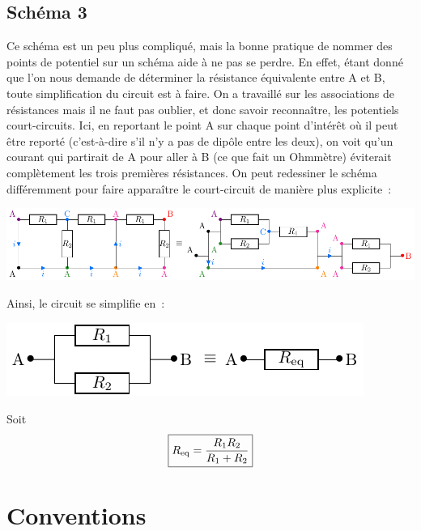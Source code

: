 \documentclass[../../main/main.tex]{subfiles}
\begin{document}
{\subsection{Schéma 3}
Ce schéma est un peu plus compliqué, mais la bonne pratique de nommer des points
de potentiel sur un schéma aide à ne pas se perdre. En effet, étant donné que
l'on nous demande de déterminer la résistance équivalente entre A et B, toute
simplification du circuit est à faire. On a travaillé sur les associations de
résistances mais il ne faut pas oublier, et donc savoir reconnaître, les
potentiels court-circuits. Ici, en reportant le point A sur chaque point
d'intérêt où il peut être reporté (c'est-à-dire s'il n'y a pas de dipôle entre
les deux), on voit qu'un courant qui partirait de A pour aller à B (ce que fait
un Ohmmètre) éviterait complètement les trois premières résistances. On peut
redessiner le schéma différemment pour faire apparaître le court-circuit de
manière plus explicite~:

\begin{center}
    \includegraphics{requiv_c}
\end{center}

Ainsi, le circuit se simplifie en~:
\begin{center}
    \includegraphics{2parrequiv}
\end{center}
Soit
\[ \boxed{R_{\rm eq} = \frac{R_1R_2}{R_1 + R_2}}\]
}
\section{Conventions}
\end{document}
